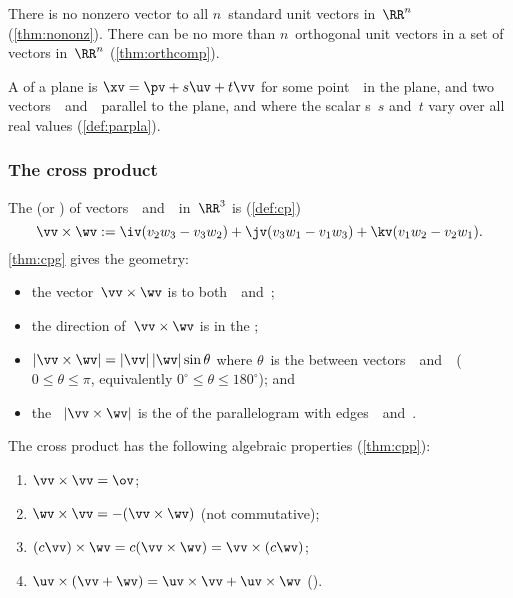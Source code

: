 \begin{itemize}
\itemlo There is no nonzero vector  to all \(n\)~{standard unit vector}s in~\(\RR^n\) (\autoref{thm:nononz}).
There can be no more than \(n\)~orthogonal unit vectors in a set of vectors in~\(\RR^n\) (\autoref{thm:orthcomp}).

\itemlo A  of a plane is \(\xv=\pv+s\uv+t\vv\) for some point~\pv\ in the plane, and two vectors~\uv\ and~\vv\  parallel to the plane, and where the scalar s~\(s\) and~\(t\) vary over all real values (\autoref{def:parpla}).




\subsubsection{The cross product}

\itemhi The   (or ) of vectors~\vv\ and~\wv\ in~\(\RR^3\) is (\autoref{def:cp})
\begin{equation*}
\vv\times\wv:=\iv(v_2w_3-v_3w_2)
+\jv(v_3w_1-v_1w_3)
+\kv(v_1w_2-v_2w_1).
\end{equation*}
\autoref{thm:cpg} gives the geometry:
\begin{itemize}
\item the vector~\(\vv\times\wv\) is  to both~\vv\ and~\wv;

\item the direction of~\(\vv\times\wv\) is in the ; 

\item \(|\vv\times\wv|=|\vv|\,|\wv|\sin\theta\) where \(\theta\)~is the  between vectors~\vv\ and~\wv\ (\(0\leq\theta\leq\pi\), equivalently \(0^\circ\leq\theta\leq180^\circ\)); and

\item the ~\(|\vv\times\wv|\) is the  of the parallelogram with edges~\vv\ and~\wv.
\end{itemize}

\itemlo The cross product has the following algebraic properties (\autoref{thm:cpp}):
\begin{enumerate}
\item \(\vv\times\vv=\ov\);
\item \(\wv\times\vv=-(\vv\times\wv)\) \quad(not commutative);
\item \((c\vv)\times\wv=c(\vv\times\wv)=\vv\times(c\wv)\);
\item \(\uv\times(\vv+\wv)=\uv\times\vv+\uv\times\wv\) \quad().
\end{enumerate}


\end{itemize}
